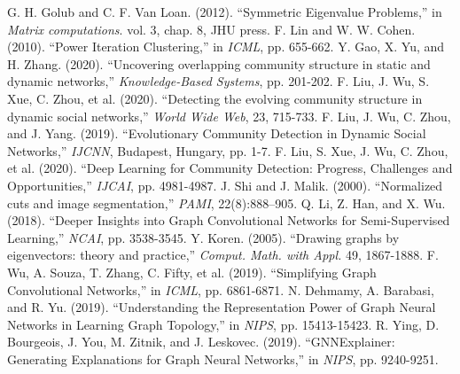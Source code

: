 \documentclass[preprint,11pt]{elsarticle}
\begin{document}



\begin{thebibliography}{00}


 G. H. Golub and C. F. Van Loan. (2012). ``Symmetric Eigenvalue Problems,'' in {\it Matrix computations}. vol. 3, chap. 8, JHU press.
F. Lin and W. W. Cohen. (2010). ``Power Iteration Clustering,'' in {\it ICML}, pp. 655-662.
Y. Gao, X. Yu, and H. Zhang. (2020). ``Uncovering overlapping community structure in static and dynamic networks,'' {\it Knowledge-Based Systems}, pp. 201-202.
F. Liu, J. Wu, S. Xue, C. Zhou, et al. (2020). ``Detecting the evolving community structure in dynamic social networks,'' {\it World Wide Web}, 23, 715-733.
F. Liu, J. Wu, C. Zhou, and J. Yang. (2019). ``Evolutionary Community Detection in Dynamic Social Networks,'' {\it IJCNN}, Budapest, Hungary, pp. 1-7.
F. Liu, S. Xue, J. Wu, C. Zhou, et al. (2020). ``Deep Learning for Community Detection: Progress, Challenges and Opportunities,'' {\it IJCAI}, pp. 4981-4987.
J. Shi and J. Malik. (2000). ``Normalized cuts and image segmentation,'' {\it PAMI}, 22(8):888–905.
Q. Li, Z. Han, and X. Wu. (2018). ``Deeper Insights into Graph Convolutional Networks for Semi-Supervised Learning,'' {\it NCAI}, pp. 3538-3545.
Y. Koren. (2005). ``Drawing graphs by eigenvectors: theory and practice,'' {\it Comput. Math. with Appl.} 49, 1867-1888.
F. Wu, A. Souza, T. Zhang, C. Fifty, et al. (2019). ``Simplifying Graph Convolutional Networks,'' in {\it ICML}, pp. 6861-6871.
N. Dehmamy, A. Barabasi, and R. Yu. (2019). ``Understanding the Representation Power of Graph Neural Networks in Learning Graph Topology,'' in {\it NIPS}, pp. 15413-15423.
R. Ying, D. Bourgeois, J. You, M. Zitnik, and J. Leskovec. (2019). ``GNNExplainer: Generating Explanations for Graph Neural Networks,'' in {\it NIPS}, pp. 9240-9251.

\end{thebibliography}
\end{document}
